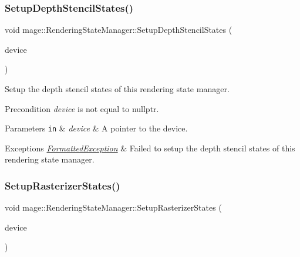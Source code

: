 \subsubsection{\texorpdfstring{Setup\+Depth\+Stencil\+States()}{SetupDepthStencilStates()}}
{\footnotesize\ttfamily void mage\+::\+Rendering\+State\+Manager\+::\+Setup\+Depth\+Stencil\+States (\begin{DoxyParamCaption}\item[{I\+D3\+D11\+Device5 $\ast$}]{device }\end{DoxyParamCaption})\hspace{0.3cm}{\ttfamily [private]}}

Setup the depth stencil states of this rendering state manager.

\begin{DoxyPrecond}{Precondition}
{\itshape device} is not equal to {\ttfamily nullptr}. 
\end{DoxyPrecond}

\begin{DoxyParams}[1]{Parameters}
\mbox{\tt in}  & {\em device} & A pointer to the device. \\
\hline
\end{DoxyParams}

\begin{DoxyExceptions}{Exceptions}
{\em \hyperlink{classmage_1_1_formatted_exception}{Formatted\+Exception}} & Failed to setup the depth stencil states of this rendering state manager. \\
\hline
\end{DoxyExceptions}
\hypertarget{classmage_1_1_rendering_state_manager_a74e37deb853254b87a0f61af178ad703}{}\label{classmage_1_1_rendering_state_manager_a74e37deb853254b87a0f61af178ad703} 
\subsubsection{\texorpdfstring{Setup\+Rasterizer\+States()}{SetupRasterizerStates()}}
{\footnotesize\ttfamily void mage\+::\+Rendering\+State\+Manager\+::\+Setup\+Rasterizer\+States (\begin{DoxyParamCaption}\item[{I\+D3\+D11\+Device5 $\ast$}]{device }\end{DoxyParamCaption})\hspace{0.3cm}{\ttfamily [private]}}

